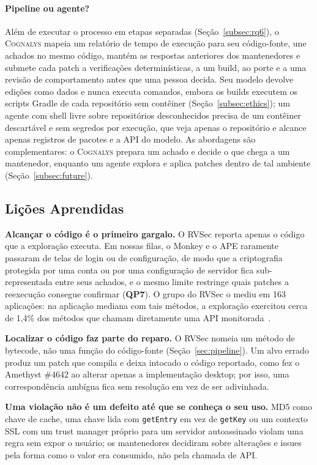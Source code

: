 \documentclass[conference]{IEEEtran}
\newcommand{\system}{\textsc{Cognalys}}
\newcommand{\researchq}[1]{\textbf{QP#1}}
\begin{document}
\paragraph{Pipeline ou agente?} Além de executar o processo em etapas separadas
(Seção~\ref{subsec:rq6}), o \system{} mapeia um relatório de tempo de execução para
seu código-fonte, une achados no mesmo código, mantém as respostas anteriores dos
mantenedores e submete cada patch a verificações determinísticas, a um build, ao porte
e a uma revisão de comportamento antes que uma pessoa decida. Seu modelo devolve edições
como dados e nunca executa comandos, embora os builds executem os scripts Gradle de cada
repositório sem contêiner (Seção~\ref{subsec:ethics}); um agente com shell livre sobre
repositórios desconhecidos precisa de um contêiner descartável e sem segredos por execução,
que veja apenas o repositório e alcance apenas registros de pacotes e a API do modelo. As abordagens são complementares: o \system{} prepara um achado e
decide o que chega a um mantenedor, enquanto um agente explora e aplica patches dentro
de tal ambiente (Seção~\ref{subsec:future}).

\subsection{Lições Aprendidas}
\label{sec:lessons}

\textbf{Alcançar o código é o primeiro gargalo.} O RVSec reporta apenas o código
que a exploração executa. Em nossas filas, o Monkey e o APE raramente passaram de telas
de login ou de configuração, de modo que a criptografia protegida por uma conta ou por
uma configuração de servidor fica sub-representada entre seus achados, e o mesmo limite
restringe quais patches a reexecução consegue confirmar (\researchq{7}). O grupo do RVSec
o mediu em 163 aplicações: na aplicação mediana com tais métodos, a exploração exercitou
cerca de 1,4\% dos métodos que chamam diretamente uma API monitorada~\cite{costa2026effectiveness}.

\textbf{Localizar o código faz parte do reparo.} O RVSec nomeia um método de
bytecode, não uma função do código-fonte (Seção~\ref{sec:pipeline}). Um alvo errado
produz um patch que compila e deixa intocado o código reportado, como fez o Amethyst
\#4642 ao alterar apenas a implementação desktop; por isso, uma correspondência ambígua
fica sem resolução em vez de ser adivinhada.

\textbf{Uma violação não é um defeito até que se conheça o seu uso.} MD5 como chave
de cache, uma chave lida com \texttt{getEntry} em vez de \texttt{getKey} ou um contexto
SSL com um trust manager próprio para um servidor autoassinado violam uma regra sem
expor o usuário; os mantenedores decidiram sobre alterações e issues pela forma como o valor
era consumido, não pela chamada de API.
\end{document}
